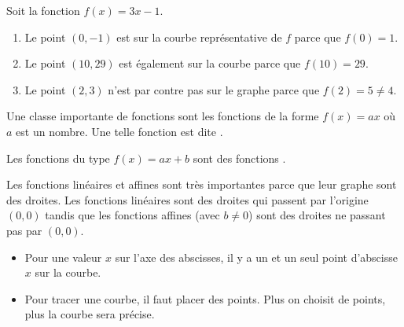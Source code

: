\begin{definition}
\end{definition}

\begin{example}
    Soit la fonction \( f(x)=3x-1\).
    \begin{enumerate}
        \item
            Le point \( (0,-1)\) est sur la courbe représentative de \( f\) parce que \( f(0)=1\).
        \item
            Le point \( (10,29)\) est également sur la courbe parce que \( f(10)=29\).
        \item
            Le point \( (2,3)\) n'est par contre pas sur le graphe parce que \( f(2)=5\neq 4\).
    \end{enumerate}
\end{example}

\begin{definition}
    Une classe importante de fonctions sont les fonctions de la forme \( f(x)=ax\) où \( a\) est un nombre. Une telle fonction est dite . 

    Les fonctions du type \( f(x)=ax+b\) sont des fonctions . 
\end{definition}
Les fonctions linéaires et affines sont très importantes parce que leur graphe sont des droites. Les fonctions linéaires sont des droites qui passent par l'origine \( (0,0)\) tandis que les fonctions affines (avec \( b\neq 0\)) sont des droites ne passant pas par \( (0,0)\).


\begin{itemize}
\item
    Pour une valeur $x$ sur l'axe des abscisses, il y a un et un seul point d'abscisse $x$ sur la courbe.
\item
    Pour tracer une courbe, il faut placer des points. Plus on choisit de points, plus la courbe sera précise.
\end{itemize}

